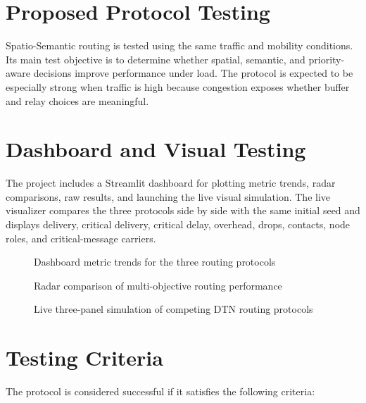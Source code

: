 \section{Proposed Protocol Testing}
Spatio-Semantic routing is tested using the same traffic and mobility conditions. Its main test objective is to determine whether spatial, semantic, and priority-aware decisions improve performance under load. The protocol is expected to be especially strong when traffic is high because congestion exposes whether buffer and relay choices are meaningful.

\section{Dashboard and Visual Testing}
The project includes a Streamlit dashboard for plotting metric trends, radar comparisons, raw results, and launching the live visual simulation. The live visualizer compares the three protocols side by side with the same initial seed and displays delivery, critical delivery, critical delay, overhead, drops, contacts, node roles, and critical-message carriers.

\begin{figure}[h!]
    \centering
    \caption{Dashboard metric trends for the three routing protocols}
    \label{fig:dashboard_trends_placeholder}
\end{figure}

\begin{figure}[h!]
    \centering
    \caption{Radar comparison of multi-objective routing performance}
    \label{fig:radar_placeholder}
\end{figure}

\begin{figure}[h!]
    \centering
    \caption{Live three-panel simulation of competing DTN routing protocols}
    \label{fig:live_sim_placeholder}
\end{figure}

\section{Testing Criteria}
The protocol is considered successful if it satisfies the following criteria:

